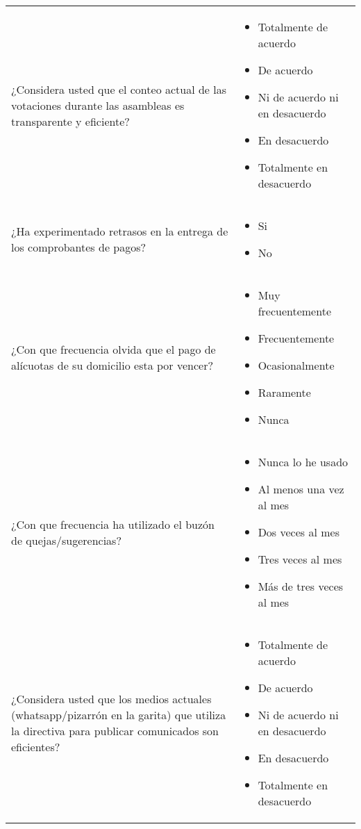 \begin{center}
\begin{small}
\begin{longtable}[c]{p{} p{}}
			¿Considera usted que el conteo actual de las votaciones durante las asambleas es transparente y eficiente? &
			\begin{itemize}
				\item Totalmente de acuerdo
				\item De acuerdo
				\item Ni de acuerdo ni en desacuerdo
				\item En desacuerdo
				\item Totalmente en desacuerdo
			\end{itemize} \\
			¿Ha experimentado retrasos en la entrega de los comprobantes de pagos? &
			\begin{itemize}
				\item Si
				\item No
			\end{itemize} \\
			¿Con que frecuencia olvida que el pago de alícuotas de su domicilio esta por vencer? &
			\begin{itemize}
				\item Muy frecuentemente
				\item Frecuentemente
				\item Ocasionalmente
				\item Raramente
				\item Nunca
			\end{itemize}\\
			¿Con que frecuencia ha utilizado el buzón de quejas/sugerencias? &
			\begin{itemize}
				\item Nunca lo he usado
				\item Al menos una vez al mes
				\item Dos veces al mes
				\item Tres veces al mes
				\item Más de tres veces al mes
			\end{itemize} \\
			¿Considera usted que los medios actuales (whatsapp/pizarrón en la garita) que utiliza la directiva para publicar comunicados son eficientes? &
			\begin{itemize}
				\item Totalmente de acuerdo
				\item De acuerdo
				\item Ni de acuerdo ni en desacuerdo
				\item En desacuerdo
				\item Totalmente en desacuerdo

\end{itemize}
\end{longtable}
\end{small}
\end{center}
